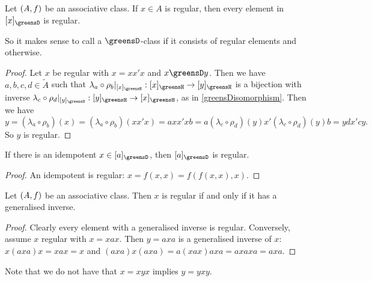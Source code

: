 \begin{proposition} 
Let $\left( A, f \right)$ be an associative class. If $x\in A$ is regular, then every element in $[x]_{\greensD}$ is regular.
\end{proposition}
So it makes sense to call a $\greensD$-class  if it consists of regular elements and  otherwise.
\begin{proof}
Let $x$ be regular with $x = xx'x$ and $x\greensD y$. Then we have $a,b,c,d \in \widetilde{A}$ such that
$\lambda_a\circ\rho_b|_{[x]_\greensH}: [x]_\greensH \to [y]_\greensH$ is a bijection with inverse $\lambda_c\circ \rho_d|_{[y]_\greensH}: [y]_\greensH \to [x]_\greensH$, as in \ref{greensDisomorphism}. Then we have
\[ y = (\lambda_a\circ\rho_b)(x) = (\lambda_a\circ\rho_b)(xx'x) = axx'xb = a(\lambda_c\circ\rho_d)(y)x'(\lambda_c\circ\rho_d)(y)b = ydx'cy. \]
So $y$ is regular.
\end{proof}
\begin{corollary}
If there is an idempotent $x\in [a]_{\greensD}$, then $[a]_{\greensD}$ is regular.
\end{corollary}
\begin{proof}
An idempotent is regular: $x = f(x,x) = f(f(x,x), x)$.
\end{proof}

\begin{proposition}
Let $\left( A, f \right)$ be an associative class. Then $x$ is regular \textup{if and only if} it has a generalised inverse.
\end{proposition}
\begin{proof}
Clearly every element with a generalised inverse is regular. Conversely, assume $x$ regular with $x = xax$. Then $y = axa$ is a generalised inverse of $x$: $x(axa)x = xax = x$ and $(axa)x(axa) = a(xax)axa = axaxa = axa$.
\end{proof}
Note that we do not have that $x = xyx$ implies $y = yxy$.

